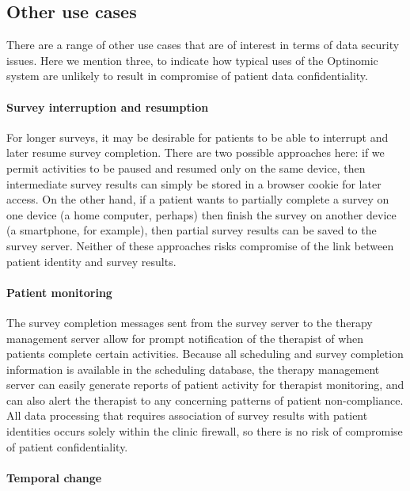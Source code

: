 \documentclass[DIV=calc,paper=a4,fontsize=11pt,twocolumn]{scrartcl}
\begin{document}
\subsection*{Other use cases}

There are a range of other use cases that are of interest in terms of
data security issues.  Here we mention three, to indicate how typical
uses of the Optinomic system are unlikely to result in compromise of
patient data confidentiality.

\paragraph{Survey interruption and resumption}

For longer surveys, it may be desirable for patients to be able to
interrupt and later resume survey completion.  There are two possible
approaches here: if we permit activities to be paused and resumed only
on the same device, then intermediate survey results can simply be
stored in a browser cookie for later access.  On the other hand, if a
patient wants to partially complete a survey on one device (a home
computer, perhaps) then finish the survey on another device (a
smartphone, for example), then partial survey results can be saved to
the survey server.  Neither of these approaches risks compromise of
the link between patient identity and survey results.

\paragraph{Patient monitoring}

The survey completion messages sent from the survey server to the
therapy management server allow for prompt notification of the
therapist of when patients complete certain activities.  Because all
scheduling and survey completion information is available in the
scheduling database, the therapy management server can easily generate
reports of patient activity for therapist monitoring, and can also
alert the therapist to any concerning patterns of patient
non-compliance.  All data processing that requires association of
survey results with patient identities occurs solely within the clinic
firewall, so there is no risk of compromise of patient
confidentiality.

\paragraph{Temporal change}
\end{document}
